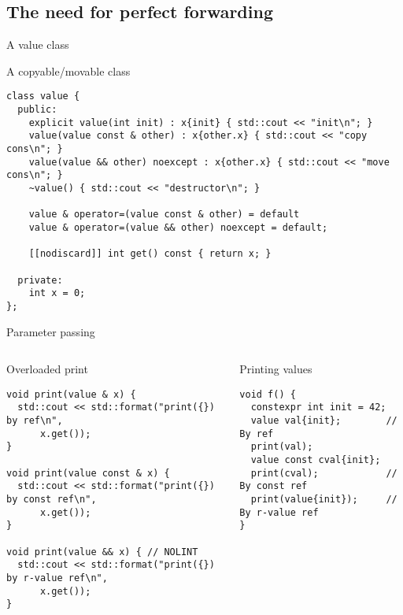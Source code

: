 \subsection{The need for perfect forwarding}

\begin{frame}[t,fragile]{A value class}
\begin{block}{A copyable/movable class}
\begin{lstlisting}
class value {
  public:
    explicit value(int init) : x{init} { std::cout << "init\n"; }
    value(value const & other) : x{other.x} { std::cout << "copy cons\n"; }
    value(value && other) noexcept : x{other.x} { std::cout << "move cons\n"; }
    ~value() { std::cout << "destructor\n"; }

    value & operator=(value const & other) = default 
    value & operator=(value && other) noexcept = default;

    [[nodiscard]] int get() const { return x; }

  private:
    int x = 0;
};
\end{lstlisting}
\end{block}
\end{frame}

\begin{frame}[t,fragile]{Parameter passing}

\begin{columns}[T]

\begin{block}{Overloaded print}
\begin{lstlisting}
void print(value & x) {
  std::cout << std::format("print({}) by ref\n", 
      x.get());
}

void print(value const & x) {
  std::cout << std::format("print({}) by const ref\n", 
      x.get());
}

void print(value && x) { // NOLINT
  std::cout << std::format("print({}) by r-value ref\n", 
      x.get());
}
\end{lstlisting}
\end{block}

\pause
{}
\begin{block}{Printing values}
\begin{lstlisting}
void f() {
  constexpr int init = 42;
  value val{init};        // By ref
  print(val);
  value const cval{init}; 
  print(cval);            // By const ref
  print(value{init});     // By r-value ref
}
\end{lstlisting}
\end{block}

\end{columns}

\end{frame}


